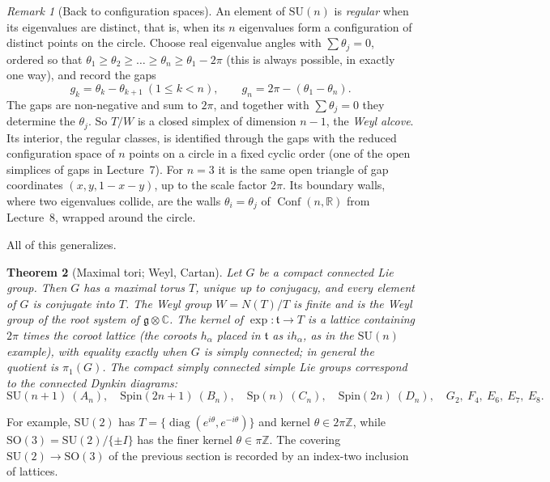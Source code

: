 \documentclass[11pt,openany]{book}
\theoremstyle{plain}
\newtheorem{theorem}{Theorem}[chapter]
\theoremstyle{definition}
\theoremstyle{remark}
\newtheorem{remark}[theorem]{Remark}
\newcommand{\R}{\mathbb{R}}
\newcommand{\Z}{\mathbb{Z}}
\newcommand{\C}{\mathbb{C}}
\newcommand{\SO}{\mathrm{SO}}
\newcommand{\Conf}{\operatorname{Conf}}
\begin{document}
\begin{remark}[Back to configuration spaces]
An element of $\mathrm{SU}(n)$ is \emph{regular} when its eigenvalues are distinct, that is, when its
$n$ eigenvalues form a configuration of distinct points on the circle. Choose real eigenvalue angles with
$\sum\theta_j=0$, ordered so that $\theta_1\ge\theta_2\ge\dots\ge\theta_n\ge\theta_1-2\pi$ (this is
always possible, in exactly one way), and record the gaps
\[
  g_k=\theta_k-\theta_{k+1}\ (1\le k<n),\qquad g_n=2\pi-(\theta_1-\theta_n).
\]
The gaps are non-negative and sum to $2\pi$, and together with $\sum\theta_j=0$ they determine the
$\theta_j$. So $T/W$ is a closed simplex of dimension $n-1$, the \emph{Weyl alcove}. Its interior, the
regular classes, is identified through the gaps with the reduced configuration space of $n$ points on a
circle in a fixed cyclic order (one of the open simplices of gaps in Lecture~7). For $n=3$ it is the same open triangle of gap coordinates $(x,y,1-x-y)$, up to the scale
factor $2\pi$. Its boundary walls, where two eigenvalues collide, are the walls $\theta_i=\theta_j$ of
$\Conf(n,\R)$ from Lecture~8, wrapped around the circle.
\end{remark}

All of this generalizes.

\begin{theorem}[Maximal tori; Weyl, Cartan]\label{LIE:thm:torus}
Let $G$ be a compact connected Lie group. Then $G$ has a maximal torus $T$, unique up to conjugacy,
and every element of $G$ is conjugate into $T$. The Weyl group $W=N(T)/T$ is finite and is the Weyl
group of the root system of $\mathfrak g\otimes\C$. The kernel of $\exp\colon\mathfrak t\to T$ is a lattice
containing $2\pi$ times the coroot lattice (the coroots $h_\alpha$ placed in $\mathfrak t$ as $ih_\alpha$,
as in the $\mathrm{SU}(n)$ example), with equality exactly when $G$ is simply connected; in general the
quotient is $\pi_1(G)$. The
compact simply connected simple Lie groups correspond to the connected Dynkin diagrams:
\[
  \mathrm{SU}(n+1)\ (A_n),\quad \mathrm{Spin}(2n+1)\ (B_n),\quad \mathrm{Sp}(n)\ (C_n),\quad
  \mathrm{Spin}(2n)\ (D_n),\quad G_2,\ F_4,\ E_6,\ E_7,\ E_8 .
\]
\end{theorem}

For example, $\mathrm{SU}(2)$ has $T=\{\operatorname{diag}(e^{i\theta},e^{-i\theta})\}$ and kernel
$\theta\in2\pi\Z$, while $\SO(3)=\mathrm{SU}(2)/\{\pm I\}$ has the finer kernel $\theta\in\pi\Z$. The covering
$\mathrm{SU}(2)\to\SO(3)$ of the previous section is recorded by an index-two inclusion of lattices.
\end{document}
